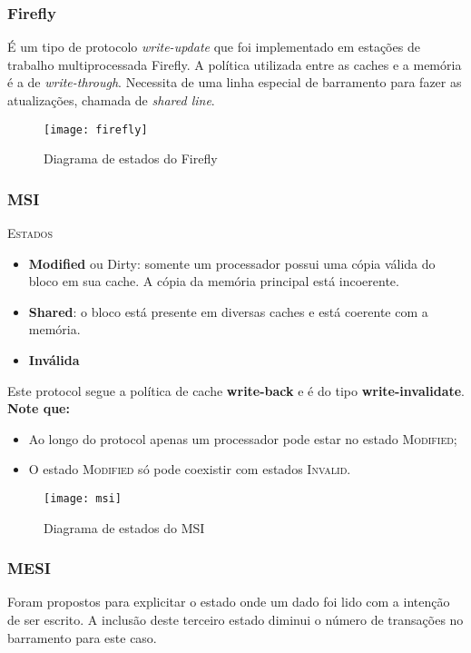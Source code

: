 \subsubsection{Firefly}
É um tipo de protocolo \textit{write-update} que foi implementado em estações de trabalho multiprocessada Firefly. A política utilizada entre as caches e a memória é a de \textit{write-through}. Necessita de uma linha especial de barramento para fazer as atualizações, chamada de \textit{shared line}.

\begin{figure}[ht]
  \centering
  \texttt{[image: firefly]}
  \label{fig:firefly-automata}
  \caption{Diagrama de estados do Firefly}
\end{figure}




\subsubsection{MSI}
\textsc{Estados}\\
\begin{itemize}
  \item \textbf{Modified} ou Dirty: somente um processador possui uma cópia válida do bloco em sua cache. A cópia da memória principal está incoerente.
  \item \textbf{Shared}: o bloco está presente em diversas caches e está coerente com a memória.
  \item \textbf{Inválida}
\end{itemize}

Este protocol segue a política de cache \textbf{write-back} e é do tipo \textbf{write-invalidate}. \textbf{Note que:}
\begin{itemize}
  \item Ao longo do protocol apenas um processador pode estar no estado \textsc{Modified};

  \item O estado \textsc{Modified} só pode coexistir com estados \textsc{Invalid}.
\end{itemize}

\begin{figure}[ht]
  \centering
  \texttt{[image: msi]}
  \label{fig:msi-automata}
  \caption{Diagrama de estados do MSI}
\end{figure}



\subsubsection{MESI}
Foram propostos para explicitar o estado onde um dado foi lido com a intenção de ser escrito. A inclusão deste terceiro estado diminui o número de transações no barramento para este caso.

